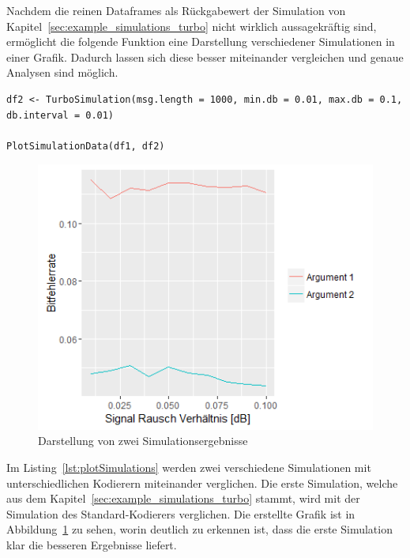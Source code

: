Nachdem die reinen Dataframes als Rückgabewert der Simulation von Kapitel~\ref{sec:example_simulations_turbo} nicht wirklich aussagekräftig sind, ermöglicht die folgende Funktion eine Darstellung verschiedener Simulationen in einer Grafik. Dadurch lassen sich diese besser miteinander vergleichen und genaue Analysen sind möglich.

\begin{lstlisting}[caption=Vergleich mehrerer Simulationen, label={lst:plotSimulations}, float=!th]
df2 <- TurboSimulation(msg.length = 1000, min.db = 0.01, max.db = 0.1, db.interval = 0.01)

PlotSimulationData(df1, df2)
\end{lstlisting}

\begin{figure}[ht]
\centering
\includegraphics[width=\ScaleIfNeeded]{pictures/PlotSimulations}
\caption{Darstellung von zwei Simulationsergebnisse}
\label{pic:plotSimulations}
\end{figure}

Im Listing~\ref{lst:plotSimulations} werden zwei verschiedene Simulationen mit unterschiedlichen Kodierern miteinander verglichen. Die erste Simulation, welche aus dem Kapitel~\ref{sec:example_simulations_turbo} stammt, wird mit der Simulation des Standard-Kodierers verglichen. Die erstellte Grafik ist in Abbildung~\ref{pic:plotSimulations} zu sehen, worin deutlich zu erkennen ist, dass die erste Simulation klar die besseren Ergebnisse liefert.

\FloatBarrier